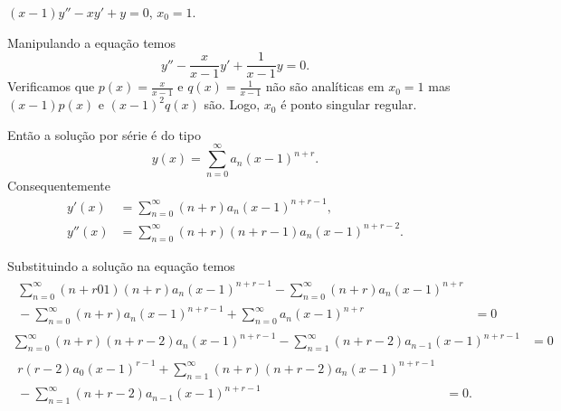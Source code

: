 \documentclass[a4paper,12pt, leqno, answers]{exam}
\begin{document}
\begin{questions}
    \question $\left( x - 1 \right) y'' - x y' + y = 0$, $x_0 = 1$.
    \begin{solution}
        Manipulando a equa\c{c}\~{a}o temos
        \[
        y'' - \frac{x}{x - 1} y' + \frac{1}{x - 1} y = 0.
        \]
        Verificamos que $p(x) = \frac{x}{x - 1}$ e $q(x) = \frac{1}{x - 1}$ n\~{a}o s\~{a}o anal\'{i}ticas em $x_0 = 1$ mas $\left( x - 1 \right) p(x)$ e $\left( x - 1 \right)^2 q(x)$ s\~{a}o. Logo, $x_0$ \'{e} ponto singular regular.

        Ent\~{a}o a solu\c{c}\~{a}o por s\'{e}rie \'{e} do tipo
        \[
        y\left( x \right) = \sum_{n = 0}^\infty a_n \left( x - 1 \right)^{n + r}.
        \]
        Consequentemente
        \begin{align*}
            y'(x) &= \sum_{n = 0}^\infty \left( n + r \right) a_n \left( x - 1 \right)^{n + r - 1}, \\
            y''(x) &= \sum_{n = 0}^\infty \left( n + r \right) \left( n + r - 1 \right) a_n \left( x - 1 \right)^{n + r - 2}.
        \end{align*}

        Substituindo a solu\c{c}\~{a}o na equa\c{c}\~{a}o temos
        \begin{align*}
            \begin{split}
                \sum_{n = 0}^\infty \left( n + r 0 1 \right) \left( n + r \right) a_n \left( x - 1 \right)^{n + r - 1} - \sum_{n = 0}^\infty \left( n + r \right) a_n \left( x - 1 \right)^{n + r} \\ {}- \sum_{n = 0}^\infty \left( n + r \right) a_n \left( x - 1 \right)^{n + r - 1} + \sum_{n = 0}^\infty a_n \left(x - 1 \right)^{n + r} &= 0
            \end{split} \\
            \sum_{n = 0}^\infty \left( n + r \right) \left( n + r - 2 \right) a_n \left( x - 1 \right)^{n + r - 1} - \sum_{n = 1}^\infty \left( n + r - 2 \right) a_{n - 1} \left( x - 1 \right)^{n + r - 1} &= 0 \\
            \begin{split}
                r\left( r - 2 \right) a_0 \left( x - 1 \right)^{r - 1} + \sum_{n = 1}^\infty \left( n + r \right) \left( n + r - 2 \right) a_n \left( x - 1 \right)^{n + r - 1} \\ {}- \sum_{n = 1}^\infty \left( n + r - 2 \right) a_{n - 1} \left( x - 1 \right)^{n + r - 1} &= 0.
            \end{split}
        \end{align*}


\end{solution}
\end{questions}
\end{document}

